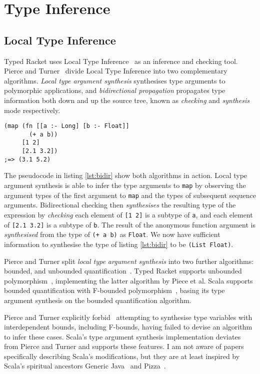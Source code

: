 \section{Type Inference}

\subsection{Local Type Inference}

Typed Racket uses Local Type Inference~\cite{PT00}
as an inference and checking tool. Pierce and Turner~\cite{PT00}
divide Local Type Inference into
two complementary algorithms. \emph{Local type argument synthesis}
synthesises type arguments to polymorphic applications, and \emph{bidirectional
propagation} propagates type information both down and up the source tree,
known as \emph{checking} and \emph{synthesis} mode respectively.

\begin{lstlisting}[caption=Bidirectional checking algorithm with Typed Clojure pseudocode, label=lst:bidir]
(map (fn [[a :- Long] [b :- Float]]
       (+ a b))
     [1 2]
     [2.1 3.2])
;=> (3.1 5.2)
\end{lstlisting}

The pseudocode in listing \ref{lst:bidir} show both algorithms in action. Local type argument synthesis is able
to infer the type arguments to \lstinline|map| by observing the argument types of the first
argument to \lstinline|map| and the types of subsequent sequence arguments. Bidirectional checking
then \emph{synthesises} the resulting type of the expression by \emph{checking} each element
of \lstinline|[1 2]| is a subtype of \lstinline|a|, and each element of \lstinline|[2.1 3.2]| is a subtype of
\lstinline|b|. The result of the anonymous function argument is \emph{synthesised} from the type of
\lstinline|(+ a b)| as \lstinline|Float|. We now have sufficient information to 
synthesise the type of listing \ref{lst:bidir} to be \lstinline|(List Float)|.

Pierce and Turner split \emph{local type argument synthesis} into two further
algorithms: bounded, and unbounded quantification~\cite{PT00}. 
Typed Racket 
supports unbounded polymorphism~\cite{Tob10}, implementing the latter algorithm by Piece et al.
Scala supports bounded quantification with F-bounded polymorphism~\cite{CCHOM89},
basing its type argument synthesis on the bounded quantification algorithm.

Pierce and Turner explicitly forbid~\cite{PT00}
attempting to synthesise type variables with interdependent bounds, including
F-bounds, having failed to devise an algorithm to infer these cases.
Scala's type argument synthesis implementation deviates from Pierce and Turner and supports these features.
I am not aware of papers specifically describing Scala's modifications, but they are at least inspired by
Scala's spiritual ancestors Generic Java~\cite{BOSW98} and Pizza~\cite{OW97}.

